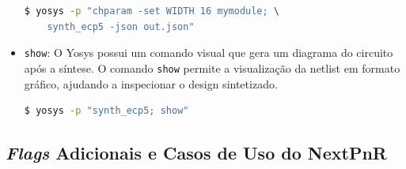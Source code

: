 \documentclass{report}
\begin{document}
\begin{itemize}
\begin{lstlisting}[language=bash]
$ yosys -p "chparam -set WIDTH 16 mymodule; \
    synth_ecp5 -json out.json"
\end{lstlisting}

\item \texttt{show}: O Yosys possui um comando visual que gera um diagrama do circuito após a síntese. O comando \texttt{show} permite a visualização da netlist em formato gráfico, ajudando a inspecionar o design sintetizado.

\begin{lstlisting}[language=bash]
$ yosys -p "synth_ecp5; show"
\end{lstlisting}
\end{itemize}

\subsection{\textit{Flags} Adicionais e Casos de Uso do NextPnR}
\end{document}
